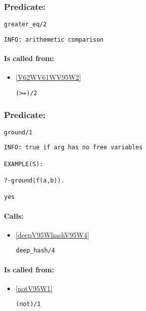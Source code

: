 \subsubsection{Predicate:} \label{greaterV95WeqV95W2}

\begin{verbatim}
greater_eq/2
\end{verbatim}

{\small \begin{verbatim}
INFO: arithemetic comparison

\end{verbatim}}
\paragraph{Is called from:} 
\begin{itemize}
\item \ref{V62WV61WV95W2} 
\begin{verbatim}
(>=)/2
\end{verbatim}

\end{itemize}

\subsubsection{Predicate:} \label{groundV95W1}

\begin{verbatim}
ground/1
\end{verbatim}

{\small \begin{verbatim}
INFO: true if arg has no free variables

EXAMPLE(S):

?-ground(f(a,b)).

yes

\end{verbatim}}
\paragraph{Calls:} 
\begin{itemize}
\item \ref{deepV95WhashV95W4} 
\begin{verbatim}
deep_hash/4
\end{verbatim}

\end{itemize}
\paragraph{Is called from:} 
\begin{itemize}
\item \ref{notV95W1} 
\begin{verbatim}
(not)/1
\end{verbatim}

\end{itemize}

